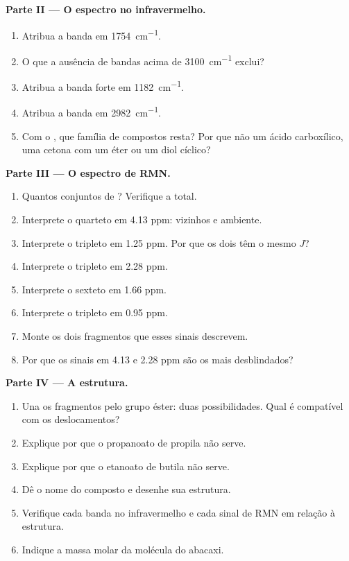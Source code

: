 \begin{problem}
\medskip
\noindent\textbf{Parte II --- O espectro no infravermelho.}
\begin{enumerate}[resume]
  \item Atribua a banda em \qty{1754}{cm^{-1}}.
  \item O que a ausência de bandas acima de \qty{3100}{cm^{-1}} exclui?
  \item Atribua a banda forte em \qty{1182}{cm^{-1}}.
  \item Atribua a banda em \qty{2982}{cm^{-1}}.
  \item Com o , que família de compostos resta? Por
        que não um ácido carboxílico, uma cetona com um éter ou um diol
        cíclico?
\end{enumerate}

\medskip
\noindent\textbf{Parte III --- O espectro de RMN.}
\begin{enumerate}[resume]
  \item Quantos conjuntos de ? Verifique a 
        total.
  \item Interprete o quarteto em 4.13 ppm: vizinhos e ambiente.
  \item Interprete o tripleto em 1.25 ppm. Por que os dois têm o mesmo
        $J$?
  \item Interprete o tripleto em 2.28 ppm.
  \item Interprete o sexteto em 1.66 ppm.
  \item Interprete o tripleto em 0.95 ppm.
  \item Monte os dois fragmentos que esses sinais descrevem.
  \item Por que os sinais em 4.13 e 2.28 ppm são os mais desblindados?
\end{enumerate}

\medskip
\noindent\textbf{Parte IV --- A estrutura.}
\begin{enumerate}[resume]
  \item Una os fragmentos pelo grupo éster: duas possibilidades. Qual é
        compatível com os deslocamentos?
  \item Explique por que o propanoato de propila não serve.
  \item Explique por que o etanoato de butila não serve.
  \item Dê o nome do composto e desenhe sua estrutura.
  \item Verifique cada banda no infravermelho e cada sinal de RMN em
        relação à estrutura.
  \item Indique a massa molar da molécula do abacaxi.
\end{enumerate}
\end{problem}

